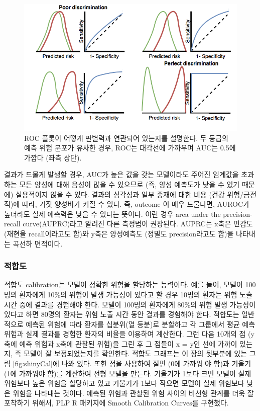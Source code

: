 \documentclass[10.5pt]{book}
\theoremstyle{definition}
\theoremstyle{definition}
\theoremstyle{definition}
\theoremstyle{remark}
\begin{document}
\begin{figure}
\includegraphics[width=1\linewidth]{images/PatientLevelPrediction/theory/roctheory} \caption{ROC 플롯이 어떻게 판별력과 연관되어 있는지를 설명한다. 두 등급의 예측 위험 분포가 유사한 경우, ROC는 대각선에 가까우며 AUC는 0.5에 가깝다 (좌측 상단).}\label{fig:figuretheoryroctheory}
\end{figure}

결과가 드물게 발생할 경우, AUC가 높은 값을 갖는 모델이라도 주어진
임계값을 초과하는 모든 양성에 대해 음성이 많을 수 있으므로 (즉, 양성
예측도가 낮을 수 있기 때문에) 실용적이지 않을 수 있다. 결과의 심각성과
일부 중재에 대한 비용 (건강 위험/금전적)에 따라, 거짓 양성비가 커질 수
있다. 즉, outcome 이 매우 드물다면, AUROC가 높더라도 실제 예측력은 낮을
수 있다는 뜻이다. 이런 경우 area under the precision-recall
curve(AUPRC)라고 알려진 다른 측정법이 권장된다. AUPRC는 x축은 민감도
(재현율 recall이라고도 함)와 y축은 양성예측도 (정밀도 precision라고도
함)을 나타내는 곡선하 면적이다.

\subsubsection*{적합도}

적합도 calibration는 모델이 정확한 위험을 할당하는 능력이다. 예를 들어,
모델이 100명의 환자에게 10\%의 위험이 발생 가능성이 있다고 할 경우
10명의 환자는 위험 노출 시간 중에 결과를 경험해야 한다. 모델이 100명의
환자에게 80\%의 위험 발생 가능성이 있다고 하면 80명의 환자는 위험 노출
시간 동안 결과를 경험해야 한다. 적합도는 일반적으로 예측된 위험에 따라
환자를 십분위(열 등분)로 분할하고 각 그룹에서 평균 예측 위험과 실제
결과를 경험한 환자의 비율을 이용하여 계산한다. 그런 다음 10개의 점
(y축에 예측 위험과 x축에 관찰된 위험)을 그린 후 그 점들이 x = y인 선에
가까이 있는지, 즉 모델이 잘 보정되었는지를 확인한다. 적합도 그래프는 이
장의 뒷부분에 있는 그림 \ref{fig:shinyCal}에 나와 있다. 또한 점을
사용하여 절편 (0에 가까워 야 함)과 기울기 (1에 가까워야 함)를 계산하여
선형 모델을 만든다. 기울기가 1보다 크면 모델이 실제 위험보다 높은 위험을
할당하고 있고 기울기가 1보다 작으면 모델이 실제 위험보다 낮은 위험을
나타내는 것이다. 예측된 위험과 관찰된 위험 사이의 비선형 관계를 더욱 잘
포착하기 위해서, PLP R 패키지에 Smooth Calibration Curves를 구현했다.
\end{document}
